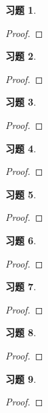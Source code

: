 \documentclass{ctexart}
\newtheorem{problem}{习题}[section]
\begin{document}
\begin{problem}
\end{problem}
\begin{proof}

\end{proof}

\begin{problem}
\end{problem}
\begin{proof}

\end{proof}

\begin{problem}
\end{problem}
\begin{proof}

\end{proof}

\setcounter{problem}{34}
\begin{problem}
\end{problem}
\begin{proof}

\end{proof}

\setcounter{problem}{36}
\begin{problem}
\end{problem}
\begin{proof}

\end{proof}

\setcounter{problem}{39}
\begin{problem}
\end{problem}
\begin{proof}

\end{proof}

\begin{problem}
\end{problem}
\begin{proof}

\end{proof}

\setcounter{problem}{43}
\begin{problem}
\end{problem}
\begin{proof}

\end{proof}

\setcounter{problem}{45}
\begin{problem}
\end{problem}
\begin{proof}

\end{proof}
\end{document}
